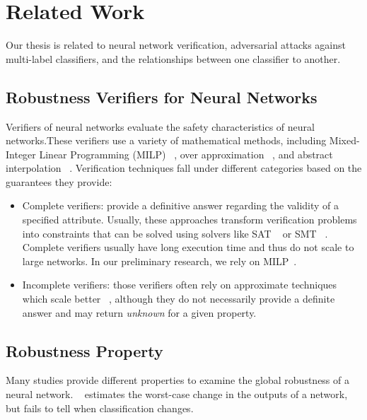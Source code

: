 
\section{Related Work}
Our thesis is related to neural network verification, adversarial attacks against multi-label classifiers, and the relationships between one classifier to another.

\subsection{Robustness Verifiers for Neural Networks}\label{subsec:verifiers}
Verifiers of neural networks evaluate the safety characteristics of neural networks.These verifiers use a variety of mathematical methods, including Mixed-Integer Linear Programming (MILP) ~\cite{singh2018robustness,lazarus2022mixed}, over approximation ~\cite{qin2019verification}, and abstract interpolation ~\cite{ABSTRACTINTER,INCOMPLETE1}. Verification techniques fall under different categories based on the guarantees they provide:
\begin{itemize}
    \item  Complete verifiers: provide a definitive answer regarding the validity of a specified attribute. Usually, these approaches transform verification problems into constraints that can be solved using solvers like SAT ~\cite{SATAPPROACH1,SATAPPROACH2} or SMT ~\cite{NNTOBINARCONSTRAINS,PLANET,Reluplex}. Complete verifiers usually have long execution time and thus do not scale to large networks.
        In our preliminary research, we rely on MILP~\cite{MIPVERIFY}.
    \item Incomplete verifiers: those verifiers often rely on approximate techniques which scale better ~\cite{INCOMPLETE1,INCOMPLETE2}, although they do not necessarily provide a definite answer and may return \emph{unknown} for a given property. 
\end{itemize}

\subsection{Robustness Property}
Many studies provide different properties to examine the global robustness of a neural network.
~\cite{Reluplex} estimates the worst-case change in the outputs of a network, but fails to tell when classification changes.

